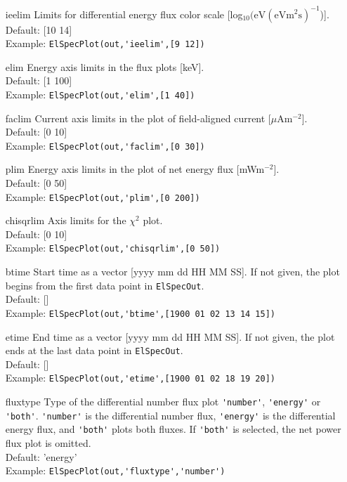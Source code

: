\documentclass[12pt,a4paper]{report}
\begin{document}
\begin{itemize}
\item[ieelim] Limits for differential energy flux color scale [log$\mathrm{_{10}(eV(eVm^2s)^{-1}}$)].\\
Default: [10 14]\\
Example: \verb|ElSpecPlot(out,'ieelim',[9 12])|\\

\item[elim] Energy axis limits in the flux plots [keV].\\
Default: [1 100]\\
Example: \verb|ElSpecPlot(out,'elim',[1 40])|\\

\item[faclim] Current axis limits in the plot of field-aligned current [$\mu$Am$^{-2}$].\\
Default: [0 10]\\
Example: \verb|ElSpecPlot(out,'faclim',[0 30])|\\

\item[plim] Energy axis limits in the plot of net energy flux [mWm$^{-2}$].\\
Default: [0 50]\\
Example: \verb|ElSpecPlot(out,'plim',[0 200])|\\

\item[chisqrlim] Axis limits for the $\chi^2$ plot.\\
Default: [0 10]\\
Example: \verb|ElSpecPlot(out,'chisqrlim',[0 50])|\\

\item[btime] Start time as a vector [yyyy mm dd HH MM SS]. If not given, the plot begins from the first data point in \verb|ElSpecOut|.\\
Default: []\\
Example: \verb|ElSpecPlot(out,'btime',[1900 01 02 13 14 15])|\\

\item[etime] End time as a vector [yyyy mm dd HH MM SS]. If not given, the plot ends at the last data point in \verb|ElSpecOut|.\\
Default: []\\
Example: \verb|ElSpecPlot(out,'etime',[1900 01 02 18 19 20])|\\

\item[fluxtype] Type of the differential number flux plot \verb|'number'|, \verb|'energy'| or \verb|'both'|. \verb|'number'| is the differential number flux, \verb|'energy'| is the differential energy flux, and \verb|'both'| plots both fluxes. If \verb|'both'| is selected, the net power flux plot is omitted. \\
Default: 'energy'\\
Example: \verb|ElSpecPlot(out,'fluxtype','number')|\\


\end{itemize}
\end{document}
